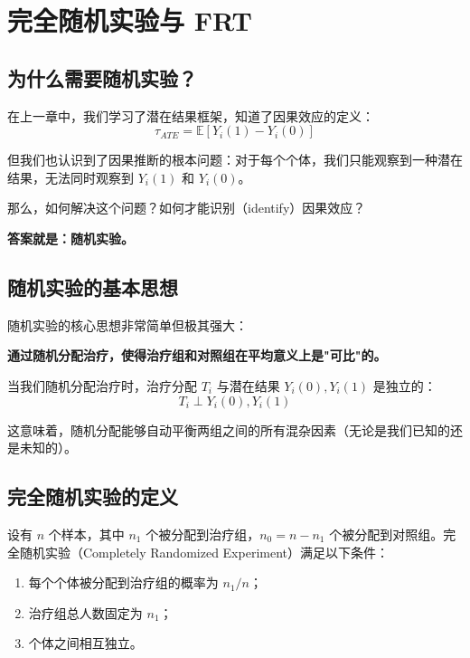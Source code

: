 
\chapter{完全随机实验与 FRT}

\section{为什么需要随机实验？}

在上一章中，我们学习了潜在结果框架，知道了因果效应的定义：
\[
\tau_{ATE} = \mathbb{E}[Y_i(1) - Y_i(0)]
\]

但我们也认识到了因果推断的根本问题：对于每个个体，我们只能观察到一种潜在结果，无法同时观察到 $Y_i(1)$ 和 $Y_i(0)$。

那么，如何解决这个问题？如何才能识别（identify）因果效应？

\textbf{答案就是：随机实验。}

\section{随机实验的基本思想}

随机实验的核心思想非常简单但极其强大：

\begin{center}
\textbf{通过随机分配治疗，使得治疗组和对照组在平均意义上是"可比"的。}
\end{center}

当我们随机分配治疗时，治疗分配 $T_i$ 与潜在结果 $Y_i(0), Y_i(1)$ 是独立的：
\[
T_i \perp Y_i(0), Y_i(1)
\]

这意味着，随机分配能够自动平衡两组之间的所有混杂因素（无论是我们已知的还是未知的）。

\section{完全随机实验的定义}

\begin{Definition}[完全随机实验]
设有 $n$ 个样本，其中 $n_1$ 个被分配到治疗组，$n_0 = n - n_1$ 个被分配到对照组。完全随机实验（Completely Randomized Experiment）满足以下条件：
\begin{enumerate}
  \item 每个个体被分配到治疗组的概率为 $n_1/n$；
  \item 治疗组总人数固定为 $n_1$；
  \item 个体之间相互独立。
\end{enumerate}
\end{Definition}

